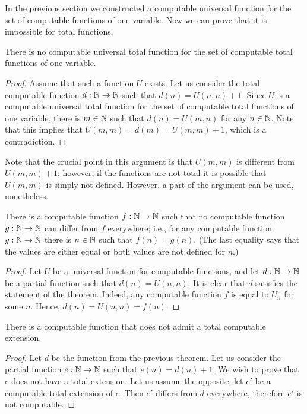 In the previous section we constructed a computable universal function for
the set of computable functions of one variable. Now we can prove that
it is impossible for total functions.
\begin{theorem}
    There is no computable universal total function for
    the set of computable total functions of one variable.
\end{theorem}
\begin{proof}
  Assume that such a function $U$ exists. Let us consider the total computable
  function $d : {\mathbb{N}} \to {\mathbb{N}}$ such that $d(n) = U(n, n) + 1$. Since $U$ is a
  computable universal total function for the set of computable total functions
  of one variable, there is $m \in {\mathbb{N}}$ such that $d(n) = U(m, n)$ for any
  $n \in {\mathbb{N}}$. Note that this implies that $U(m, m) = d(m) = U(m, m) + 1$,
  which is a contradiction.
\end{proof}
Note that the crucial point in this argument is that $U(m, m)$ is different
from $U(m, m) + 1$; however, if the functions are not total it is possible
that $U(m, m)$ is simply not defined. However, a part of the argument can be
used, nonetheless.
\begin{theorem}
\label{theorem:intersecting-function}
    There is a computable function $f : {\mathbb{N}} \to {\mathbb{N}}$ such that
    no computable function $g : {\mathbb{N}} \to {\mathbb{N}}$ can differ from $f$
    everywhere; i.e., for any computable function $g : {\mathbb{N}} \to {\mathbb{N}}$
    there is $n \in {\mathbb{N}}$ such that $f(n) = g(n)$.
    (The last equality says that the values are either equal or
    both values are not defined for $n$.)
\end{theorem}
\begin{proof}
  Let $U$ be a universal function for computable functions, and
  let $d : {\mathbb{N}} \to {\mathbb{N}}$ be a partial function such that $d(n) = U(n, n)$.
  It is clear that $d$ satisfies the statement of the theorem. Indeed,
  any computable function $f$ is equal to $U_n$  for some $n$. Hence,
  $d(n) = U(n, n) = f(n)$.
\end{proof}

\begin{theorem}
    There is a computable function that does not admit a total computable
    extension.
\end{theorem}
\begin{proof}
  Let $d$ be the function from the previous theorem. Let us consider the
  partial function $e : {\mathbb{N}} \to {\mathbb{N}}$ such that $e(n) = d(n) + 1$.
  We wish to prove that $e$ does not have a total extension. Let us assume
  the opposite, let $e'$ be a computable total extension of $e$. Then $e'$
  differs from $d$ everywhere, therefore $e'$ is not computable.
\end{proof}

